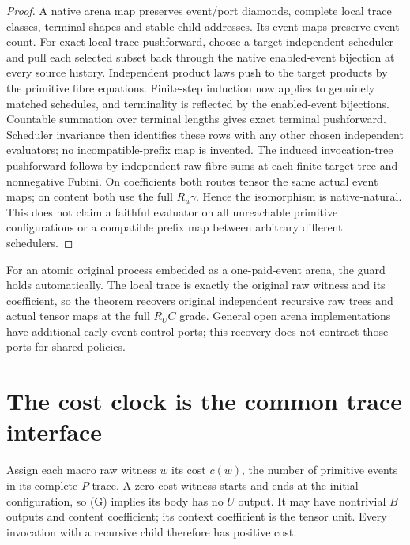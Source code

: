 \documentclass[11pt]{article}
\begin{document}
\begin{proof}
A native arena map preserves event/port diamonds, complete local trace classes, terminal shapes and stable child addresses. Its event maps preserve event count. For exact local trace pushforward, choose a target independent scheduler and pull each selected subset back through the native enabled-event bijection at every source history. Independent product laws push to the target products by the primitive fibre equations. Finite-step induction now applies to genuinely matched schedules, and terminality is reflected by the enabled-event bijections. Countable summation over terminal lengths gives exact terminal pushforward. Scheduler invariance then identifies these rows with any other chosen independent evaluators; no incompatible-prefix map is invented. The induced invocation-tree pushforward follows by independent raw fibre sums at each finite target tree and nonnegative Fubini. On coefficients both routes tensor the same actual event maps; on content both use the full $R_u\gamma$. Hence the isomorphism is native-natural. This does not claim a faithful evaluator on all unreachable primitive configurations or a compatible prefix map between arbitrary different schedulers.
\end{proof}

For an atomic original process embedded as a one-paid-event arena, the guard holds automatically. The local trace is exactly the original raw witness and its coefficient, so the theorem recovers original independent recursive raw trees and actual tensor maps at the full $R_UC$ grade. General open arena implementations have additional early-event control ports; this recovery does not contract those ports for shared policies.

\section{The cost clock is the common trace interface}
Assign each macro raw witness $w$ its cost $c(w)$, the number of primitive events in its complete $P$ trace. A zero-cost witness starts and ends at the initial configuration, so (G) implies its body has no $U$ output. It may have nontrivial $B$ outputs and content coefficient; its context coefficient is the tensor unit. Every invocation with a recursive child therefore has positive cost.
\end{document}
